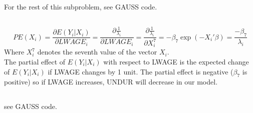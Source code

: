 \documentclass[11pt]{article}
\theoremstyle{break}
\begin{document}
For the rest of this subproblem, see GAUSS code.

\subsection{}
$$PE(X_i) = \frac{\partial E(Y_i|X_i)}{\partial LWAGE_i} = \frac{\partial{\frac{1}{\lambda_i}}}{\partial LWAGE_i} = \frac{\partial{\frac{1}{\lambda_i}}}{\partial X_i^7} = -\beta_7\exp(-X_i'\beta) = \frac{-\beta_7}{\lambda_i}$$ Where $X_i^7$ denotes the seventh value of the vector $X_i$.
\\

The partial effect of $E(Y_i|X_i)$ with respect to LWAGE is the expected change of $E(Y_i|X_i)$ if LWAGE changes by 1 unit. The partial effect is negative ($\beta_7$ is positive) so if LWAGE increases, UNDUR will decrease in our model.

\subsection{}
see GAUSS code.
\end{document}
